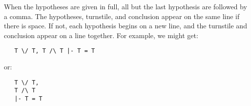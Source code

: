 \noindent
When the hypotheses are given in full, all but the last hypothesis are
followed by a comma. The hypotheses, turnstile, and conclusion appear on the
same line if there is space. If not, each hypothesis begins on a new line, and
the turnstile and conclusion appear on a line together. For example, we might
get:

\begin{small}\begin{verbatim}
   T \/ T, T /\ T |- T = T
\end{verbatim}\end{small}

\noindent
or:

\begin{small}\begin{verbatim}
   T \/ T,
   T /\ T
   |- T = T
\end{verbatim}\end{small}

